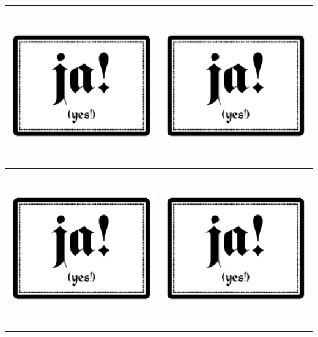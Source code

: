 \documentclass[12pt,a4paper,spanish]{article}
\begin{document}
	\newpage
	
	\begin{table}
		\centering
		\begin{tabular}{|c|c|}
			\toprule
				\includegraphics[height=6.74cm]{./Drawings/ja!.pdf} &
				\includegraphics[height=6.74cm]{./Drawings/ja!.pdf} \\
			\midrule
				\includegraphics[height=6.74cm]{./Drawings/ja!.pdf} &
				\includegraphics[height=6.74cm]{./Drawings/ja!.pdf} \\

\end{tabular}
\end{table}
\end{document}
